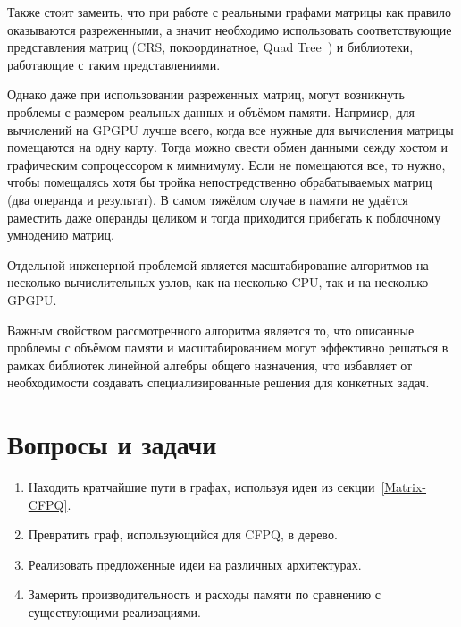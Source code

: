 Также стоит замеить, что при работе с реальными графами матрицы как правило оказываются разреженными, а значит необходимо использовать соответствующие представления матриц (CRS, покоординатное, Quad Tree~\cite{quadtree}) и библиотеки, работающие с таким представлениями. 

Однако даже при использовании разреженных матриц, могут возникнуть проблемы с размером реальных данных и объёмом памяти. Напрмиер, для вычислений на GPGPU лучше всего, когда все нужные для вычисления матрицы помещаются на одну карту. Тогда можно свести обмен данными сежду хостом и графическим сопроцессором к мимнимуму. Если не помещаются все, то нужно, чтобы помещалясь хотя бы тройка непостредственно обрабатываемых матриц (два операнда и результат). В самом тяжёлом случае в памяти не удаётся раместить даже операнды целиком и тогда приходится прибегать к поблочному умнодению матриц.

Отдельной инженерной проблемой является масштабирование алгоритмов на несколько вычислительных узлов, как на несколько CPU, так и на несколько GPGPU.

Важным свойством рассмотренного алгоритма является то, что описанные проблемы с объёмом памяти и масштабированием могут эффективно решаться в рамках библиотек линейной алгебры общего назначения, что избавляет от необходимости создавать специализированные решения для конкетных задач. 


\section{Вопросы и задачи}
\begin{enumerate}
    \item Находить кратчайшие пути в графах, используя идеи из секции~\ref{Matrix-CFPQ}.
    \item Превратить граф, использующийся для CFPQ, в дерево.
    \item Реализовать предложенные идеи на различных архитектурах.
    \item Замерить производительность и расходы памяти по сравнению с существующими реализациями.
\end{enumerate}
